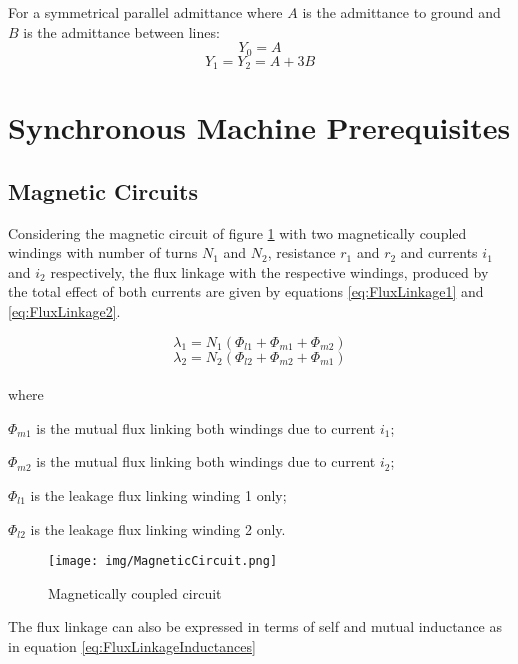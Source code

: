 For a symmetrical parallel admittance where $A$ is the admittance to ground and $B$ is the admittance between lines:
\begin{equation}
    Y_{0} = A
\end{equation}
\begin{equation}
    Y_{1} = Y_{2} = A + 3B
\end{equation}

\section{Synchronous Machine Prerequisites}

\subsection{Magnetic Circuits}
 
Considering the magnetic circuit of figure \ref{fig:MagneticCircuit} with two magnetically coupled windings with number of turns $N_1$ and $N_2$, resistance $r_1$ and $r_2$ and currents $i_1$ and $i_2$ respectively, the flux linkage with the respective windings, produced by the total effect of both currents are given by equations \ref{eq:FluxLinkage1} and \ref{eq:FluxLinkage2}.

\begin{equation} \label{eq:FluxLinkage1}
	\lambda_1 = N_1(\Phi_{l1} + \Phi_{m1} + \Phi_{m2})
\end{equation}
\begin{equation} \label{eq:FluxLinkage2}
	\lambda_2 = N_2(\Phi_{l2} + \Phi_{m2} + \Phi_{m1})
\end{equation}
\\
where

$\Phi_{m1}$ is the mutual flux linking both windings due to current $i_1$;

$\Phi_{m2}$ is the mutual flux linking both windings due to current $i_2$;

$\Phi_{l1}$ is the leakage flux linking winding 1 only;

$\Phi_{l2}$ is the leakage flux linking winding 2 only.

\begin{figure}[h]
	\centering
	\texttt{[image: img/MagneticCircuit.png]} 
	\caption{Magnetically coupled circuit}
	\label{fig:MagneticCircuit}
\end{figure}

The flux linkage can also be expressed in terms of self and mutual inductance as in equation \ref{eq:FluxLinkageInductances}

